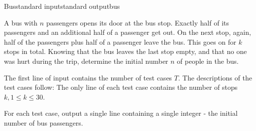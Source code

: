 \begin{problem}{Bus}{standard input}{standard output}{bus}

A bus with $n$ passengers opens its door at the bus stop. Exactly half of its passengers and an
additional half of a passenger get out. On the next stop, again, half of the passengers plus half
of a passenger leave the bus. This goes on for $k$ stops in total. Knowing that the bus leaves the
last stop empty, and that no one was hurt during the trip, determine the initial number $n$ of
people in the bus.\\

\InputFile

The first line of input contains the number of test cases $T$. The descriptions of the test cases
follow: The only line of each test case contains the number of stops $k, 1 \leq k \leq 30$.

\OutputFile

For each test case, output a single line containing a single integer - the initial number of bus
passengers.

\Example

\begin{example}
%
\end{example}

\end{problem}
